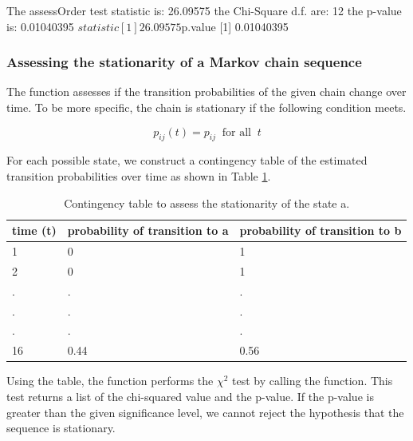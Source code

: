 \documentclass[nojss]{jss}
\begin{document}
\begin{Schunk}
\begin{Soutput}
The assessOrder test statistic is:  26.09575  the Chi-Square d.f. are:  12  the p-value is:  0.01040395 
$statistic
[1] 26.09575

$p.value
[1] 0.01040395
\end{Soutput}
\end{Schunk}

\subsubsection{Assessing the stationarity of a Markov chain sequence}
The  function assesses if the transition probabilities of the given chain change over time. To be more specific, the chain is stationary if the following condition meets.

\begin{equation}
p_{ij}(t) = p_{ij} ~\textrm{ for all }~t
\label{eq:stationarity}
\end{equation}

For each possible state, we construct a contingency table of the estimated transition probabilities over time as shown in Table \ref{tab:stationarity}.

\begin{table}[h]
  \centering
  \begin{tabular}{l | l | l}
    \hline
  time (t) & probability of transition to a & probability of transition to b \\
    \hline  \hline
  1 & 0 & 1\\
  2 & 0 & 1\\
  . & . & . \\
  . & . & . \\
  . & . & . \\
  16 & 0.44 & 0.56\\
  \hline
\end{tabular}
\caption{Contingency table to assess the stationarity of the state a.}
\label{tab:stationarity}
\end{table} 

Using the table, the function performs the $\chi ^2$ test by calling the  function.
This test returns a list of the chi-squared value and the p-value.
If the p-value is greater than the given significance level, we cannot reject the hypothesis that the sequence is stationary.
\end{document}

